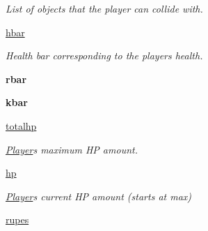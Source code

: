 \begin{DoxyCompactItemize}
\begin{DoxyCompactList}\small\item\em List of objects that the player can collide with. \end{DoxyCompactList}\item 
\mbox{\label{classactor_1_1player_1_1_player_a8678a9b7bbec1f8a257498fdd66597fb}} 
\hyperlink{classactor_1_1player_1_1_player_a8678a9b7bbec1f8a257498fdd66597fb}{hbar}
\begin{DoxyCompactList}\small\item\em Health bar corresponding to the player\textquotesingle{}s health. \end{DoxyCompactList}\item 
\mbox{\label{classactor_1_1player_1_1_player_a31f4d4cef26800b302bb683ab0008851}} 
{\bfseries rbar}
\item 
\mbox{\label{classactor_1_1player_1_1_player_afa08d9f1172947ccc9eb5e5bae3a7a8e}} 
{\bfseries kbar}
\item 
\mbox{\label{classactor_1_1player_1_1_player_af93fcffe1d5f4b16ad7ca71b54a779d7}} 
\hyperlink{classactor_1_1player_1_1_player_af93fcffe1d5f4b16ad7ca71b54a779d7}{totalhp}
\begin{DoxyCompactList}\small\item\em \hyperlink{classactor_1_1player_1_1_player}{Player}\textquotesingle{}s maximum HP amount. \end{DoxyCompactList}\item 
\mbox{\label{classactor_1_1player_1_1_player_ae153752032a484c8f84d11a3bd4ad922}} 
\hyperlink{classactor_1_1player_1_1_player_ae153752032a484c8f84d11a3bd4ad922}{hp}
\begin{DoxyCompactList}\small\item\em \hyperlink{classactor_1_1player_1_1_player}{Player}\textquotesingle{}s current HP amount (starts at max) \end{DoxyCompactList}\item 
\mbox{\label{classactor_1_1player_1_1_player_aafe402d4ccb42214e7afa642a97a91ee}} 
\hyperlink{classactor_1_1player_1_1_player_aafe402d4ccb42214e7afa642a97a91ee}{rupes}

\end{DoxyCompactItemize}
